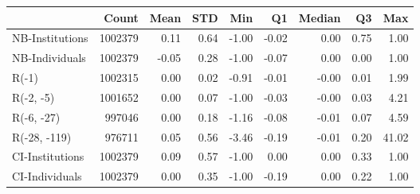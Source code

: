\documentclass[border=0.2cm]{standalone}
\begin{document}
\begin{tabular}{lrrrrrrrr}
    \toprule
                    & Count   & Mean  & STD  & Min   & Q1    & Median & Q3   & Max   \\
    \midrule
    NB-Institutions & 1002379 & 0.11  & 0.64 & -1.00 & -0.02 & 0.00   & 0.75 & 1.00  \\
    NB-Individuals  & 1002379 & -0.05 & 0.28 & -1.00 & -0.07 & 0.00   & 0.00 & 1.00  \\
    R(-1)           & 1002315 & 0.00  & 0.02 & -0.91 & -0.01 & -0.00  & 0.01 & 1.99  \\
    R(-2, -5)       & 1001652 & 0.00  & 0.07 & -1.00 & -0.03 & -0.00  & 0.03 & 4.21  \\
    R(-6, -27)      & 997046  & 0.00  & 0.18 & -1.16 & -0.08 & -0.01  & 0.07 & 4.59  \\
    R(-28, -119)    & 976711  & 0.05  & 0.56 & -3.46 & -0.19 & -0.01  & 0.20 & 41.02 \\
    CI-Institutions & 1002379 & 0.09  & 0.57 & -1.00 & 0.00  & 0.00   & 0.33 & 1.00  \\
    CI-Individuals  & 1002379 & 0.00  & 0.35 & -1.00 & -0.19 & 0.00   & 0.22 & 1.00  \\
    \bottomrule
\end{tabular}
\end{document}
